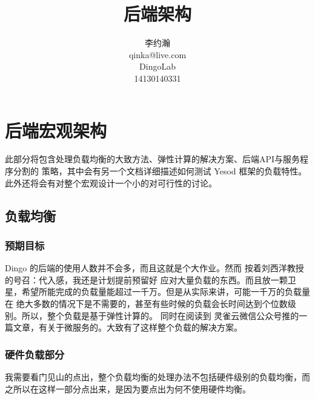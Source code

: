 







\makeatletter
\def\@NoStyleChaper{\ralex} %
\def\@ARCHDoc{\ralex} %
\def\@UsingAppendix{\ralex} %
\def\@DocType{article}
\def\@DocTypeCTEX{ctexart}
\makeatother


\title{后端架构}
\author{李约瀚 \\ qinka@live.com \\ DingoLab \\ 14130140331}


\maketitle
\newpage

\section{后端宏观架构}

此部分将包含处理负载均衡的大致方法、弹性计算的解决方案、后端API与服务程序分割的
策略，其中会有另一个文档详细描述如何测试 Yesod 框架的负载特性。
此外还将会有对整个宏观设计一个小的对可行性的讨论。


\subsection{负载均衡}
\subsubsection{预期目标}
Dingo 的后端的使用人数并不会多，而且这就是个大作业。然而 按着刘西洋教授的号召：代入感，我还是计划提前预留好
应对大量负载的东西。而且放一颗卫星，希望所能完成的负载量能超过一千万。但是从实际来讲，可能一千万的负载量在
绝大多数的情况下是不需要的，甚至有些时候的负载会长时间达到个位数级别。所以，整个负载是基于弹性计算的。
同时在阅读到 灵雀云微信公众号推的一篇文章，有关于微服务的。大致有了这样整个负载的解决方案。
\subsubsection{硬件负载部分}
我需要看门见山的点出，整个负载均衡的处理办法不包括硬件级别的负载均衡，而之所以在这样一部分点出来，是因为要点出为何不使用硬件均衡。

